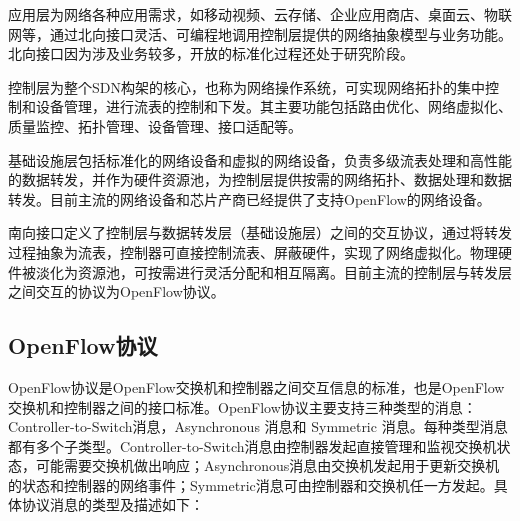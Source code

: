 应用层为网络各种应用需求，如移动视频、云存储、企业应用商店、桌面云、物联网等，通过北向接口灵活、可编程地调用控制层提供的网络抽象模型与业务功能。北向接口因为涉及业务较多，开放的标准化过程还处于研究阶段。

控制层为整个SDN构架的核心，也称为网络操作系统，可实现网络拓扑的集中控制和设备管理，进行流表的控制和下发。其主要功能包括路由优化、网络虚拟化、质量监控、拓扑管理、设备管理、接口适配等。

基础设施层包括标准化的网络设备和虚拟的网络设备，负责多级流表处理和高性能的数据转发，并作为硬件资源池，为控制层提供按需的网络拓扑、数据处理和数据转发。目前主流的网络设备和芯片产商已经提供了支持OpenFlow的网络设备。

南向接口定义了控制层与数据转发层（基础设施层）之间的交互协议，通过将转发过程抽象为流表，控制器可直接控制流表、屏蔽硬件，实现了网络虚拟化。物理硬件被淡化为资源池，可按需进行灵活分配和相互隔离。目前主流的控制层与转发层之间交互的协议为OpenFlow协议。
\subsection{OpenFlow协议}
OpenFlow协议是OpenFlow交换机和控制器之间交互信息的标准，也是OpenFlow交换机和控制器之间的接口标准。OpenFlow协议主要支持三种类型的消息：Controller-to-Switch消息，Asynchronous 消息和 Symmetric 消息。每种类型消息都有多个子类型。Controller-to-Switch消息由控制器发起直接管理和监视交换机状态，可能需要交换机做出响应；Asynchronous消息由交换机发起用于更新交换机的状态和控制器的网络事件；Symmetric消息可由控制器和交换机任一方发起。具体协议消息的类型及描述如下：

